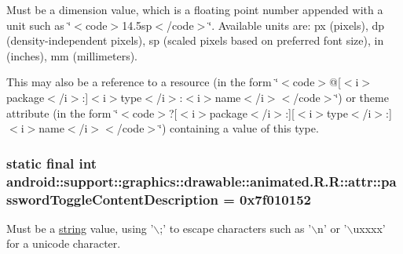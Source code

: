 Must be a dimension value, which is a floating point number appended with a unit such as \char`\"{}$<$code$>$14.5sp$<$/code$>$\char`\"{}. Available units are: px (pixels), dp (density-independent pixels), sp (scaled pixels based on preferred font size), in (inches), mm (millimeters). 

This may also be a reference to a resource (in the form \char`\"{}$<$code$>$@\mbox{[}$<$i$>$package$<$/i$>$:\mbox{]}$<$i$>$type$<$/i$>$:$<$i$>$name$<$/i$>$$<$/code$>$\char`\"{}) or theme attribute (in the form \char`\"{}$<$code$>$?\mbox{[}$<$i$>$package$<$/i$>$:\mbox{]}\mbox{[}$<$i$>$type$<$/i$>$:\mbox{]}$<$i$>$name$<$/i$>$$<$/code$>$\char`\"{}) containing a value of this type. \hypertarget{classandroid_1_1support_1_1graphics_1_1drawable_1_1animated_1_1_r_1_1attr_1a778b8e61bd3bfed202d24fc1b6d904}{
\subsubsection[{passwordToggleContentDescription}]{\setlength{\rightskip}{0pt plus 5cm}static final int android::support::graphics::drawable::animated.R.R::attr::passwordToggleContentDescription = 0x7f010152}}
\label{classandroid_1_1support_1_1graphics_1_1drawable_1_1animated_1_1_r_1_1attr_1a778b8e61bd3bfed202d24fc1b6d904}


Must be a \hyperlink{classandroid_1_1support_1_1graphics_1_1drawable_1_1animated_1_1_r_1_1string}{string} value, using '$\backslash$;' to escape characters such as '$\backslash$n' or '$\backslash$uxxxx' for a unicode character. 

